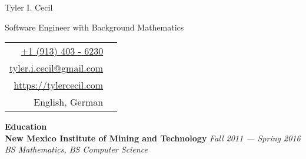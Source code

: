 \documentclass[11pt,a4paper,sans]{article}
\newcommand{\cvcolor}[1]{{\color{MidnightBlue}#1}}
\renewcommand{\section}[1]{
  \cvcolor{\noindent \textbf{\LARGE #1}}
  \vspace{.5em}\\
}
\begin{document}
\noindent
\begin{minipage}{0.675\linewidth}
 {
 \fontsize{40pt}{50pt}\selectfont
 \noindent
 {Tyler I. Cecil}}\\
 {\Large \color{darkgray} {
   \vspace{-0.75em}

   \noindent
   Software Engineer with Background Mathematics
 }}
\end{minipage}
\hfill
\begin{tabular}{|rl}
  \href{tel:+1 (913) 403 - 6230}{+1 (913) 403 - 6230}&\cvcolor{\faPhone} \\
  \href{mailto:tyler.i.cecil@gmail.com}{tyler.i.cecil@gmail.com}&\cvcolor{\faEnvelope} \\
  \href{https://tylercecil.com}{https://tylercecil.com}&\cvcolor{\faGlobe} \\
  English, German & \cvcolor{\faLanguage} \\
\end{tabular}

\vspace{0.5em}
\noindent\hrulefill
\vspace{1em}

\section{Education}
\textbf{New Mexico Institute of Mining and Technology} \hfill \textsl{Fall 2011 --- Spring 2016}\\
\textsl{BS Mathematics, BS Computer Science}\\
\end{document}
